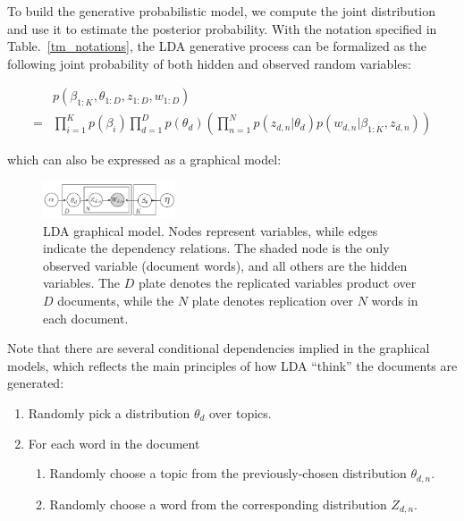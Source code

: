 \documentclass[conference]{IEEEtran}
\begin{document}
%
To build the generative probabilistic model, we compute the joint distribution and use it to estimate the posterior probability. With the notation specified in Table.~\ref{tm_notations}, the LDA generative process can be formalized as the following joint probability of both hidden and observed random variables:

\begin{align*}
	&p(\beta_{1:K}, \theta_{1:D}, z_{1:D}, w_{1:D})\\
	=& \prod_{i=1}^K p(\beta_i)\prod_{d=1}^D p(\theta_d) \left( \prod_{n=1}^N p(z_{d,n} | \theta_d) p(w_{d,n} | \beta_{1:K}, z_{d,n})\right)
\end{align*}

which can also be expressed as a graphical model:
\begin{figure}[h]
	\center
	\includegraphics[width=0.35\textwidth]{fig/gm.png}
	\caption{LDA graphical model. Nodes represent variables, while edges indicate the dependency relations. The shaded node is the only observed variable (document words), and all others are the hidden variables. The $D$ plate denotes the replicated variables product over $D$ documents, while the $N$ plate denotes replication over $N$ words in each document.}
	\label{graphical_model}
\end{figure}

Note that there are several conditional dependencies implied in the graphical models, which reflects the main principles of how LDA ``think'' the documents are generated:

\begin{enumerate}
\item Randomly pick a distribution $\theta_d$ over topics.
\item For each word in the document
	\begin{enumerate}
	\item Randomly choose a topic from the previously-chosen distribution $\theta_{d,n}$.
	\item Randomly choose a word from the corresponding distribution $Z_{d,n}$.
	\end{enumerate}
\end{enumerate}
\end{document}
